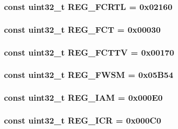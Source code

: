 \label{namespaceiGbReg_a9035848a36c2d1c1dabebf2c06e48ec4}
\hypertarget{namespaceiGbReg_a101890cb2355a85cf060a07aeef60d89}{
\subsubsection[{REG\_\-FCRTL}]{\setlength{\rightskip}{0pt plus 5cm}const {\bf uint32\_\-t} {\bf REG\_\-FCRTL} = 0x02160}}
\label{namespaceiGbReg_a101890cb2355a85cf060a07aeef60d89}
\hypertarget{namespaceiGbReg_ab74980c02376c3fb79873d6bc34a15df}{
\subsubsection[{REG\_\-FCT}]{\setlength{\rightskip}{0pt plus 5cm}const {\bf uint32\_\-t} {\bf REG\_\-FCT} = 0x00030}}
\label{namespaceiGbReg_ab74980c02376c3fb79873d6bc34a15df}
\hypertarget{namespaceiGbReg_aa36baad1c52cf734cd536d65a54602a8}{
\subsubsection[{REG\_\-FCTTV}]{\setlength{\rightskip}{0pt plus 5cm}const {\bf uint32\_\-t} {\bf REG\_\-FCTTV} = 0x00170}}
\label{namespaceiGbReg_aa36baad1c52cf734cd536d65a54602a8}
\hypertarget{namespaceiGbReg_a80005f52855fb630c17c4da9971ef2fc}{
\subsubsection[{REG\_\-FWSM}]{\setlength{\rightskip}{0pt plus 5cm}const {\bf uint32\_\-t} {\bf REG\_\-FWSM} = 0x05B54}}
\label{namespaceiGbReg_a80005f52855fb630c17c4da9971ef2fc}
\hypertarget{namespaceiGbReg_a4c6f0da1f8268af5106cbb06a399afc0}{
\subsubsection[{REG\_\-IAM}]{\setlength{\rightskip}{0pt plus 5cm}const {\bf uint32\_\-t} {\bf REG\_\-IAM} = 0x000E0}}
\label{namespaceiGbReg_a4c6f0da1f8268af5106cbb06a399afc0}
\hypertarget{namespaceiGbReg_a24c53e651278cac8ad2d31eb921e4879}{
\subsubsection[{REG\_\-ICR}]{\setlength{\rightskip}{0pt plus 5cm}const {\bf uint32\_\-t} {\bf REG\_\-ICR} = 0x000C0}}
